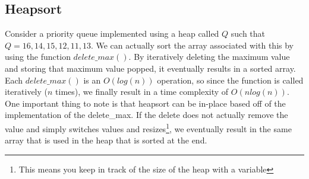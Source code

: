 \documentclass[11pt,a4paper,english]{report}
\begin{document}
\subsection{Heapsort}

Consider a priority queue implemented using a heap called $Q$ such that $Q = {16, 14, 15, 12, 11, 13}$. We can actually sort the array associated with this by using the function $delete\_max()$. By iteratively deleting the maximum value and storing that maximum value popped, it eventually results in a sorted array. Each $delete\_max()$ is an $O(log(n))$ operation, so since the function is called iteratively ($n$ times), we finally result in a time complexity of $O(n log(n))$.
\bigskip
\noindent One important thing to note is that heapsort can be in-place based off of the implementation of the delete\_max. If the delete does not actually remove the value and simply switches values and resizes\footnote{This means you keep in track of the size of the heap with a variable}, we eventually result in the same array that is used in the heap that is sorted at the end. 
\end{document}
